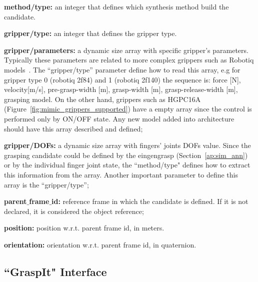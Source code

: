 \begin{itemize_jp}
    \item \textbf{method/type:} an integer that defines which synthesis method build the candidate. %
    \item \textbf{gripper/type:} an integer that defines the gripper type. %
    \item \textbf{gripper/parameters:} a dynamic size array with specific gripper's parameters. Typically these parameters are related to more complex grippers such as Robotiq models~\cite{robotiq_grippers}. The ``gripper/type'' parameter define how to read this array, e.g for gripper type 0 (robotiq 2f84) and 1 (robotiq 2f140) the sequence is: force [N], velocity[m/s], pre-grasp-width [m], grasp-width [m], grasp-release-width [m], grasping model. On the other hand, grippers such as HGPC16A (Figure~\ref{fig:mimic_grippers_supported}) have a empty array since the control is performed only by ON/OFF state. Any new model added into architecture should have this array described and defined;
    \item \textbf{gripper/DOFs:} a dynamic size array with fingers' joints \acp{DOF} value. Since the grasping candidate could be defined by the eingengrasp (Section~\ref{ap:sim_ann}) or by the individual finger joint state, the ``method/type" defines how to extract this information from the array. Another important parameter to define this array is the ``gripper/type''; 
    \item \textbf{parent$\_$frame$\_$id:} reference frame in which the candidate is defined. If it is not declared, it is considered the object reference;
    \item \textbf{position:} position w.r.t. parent frame id, in meters.
    \item \textbf{orientation:} orientation w.r.t. parent frame id, in quaternion.
\end{itemize_jp}

\subsection{``GraspIt" Interface}
\label{cap4:modular_grasping_architecture:sec:grasping_synthesis:subsec:graspit}

